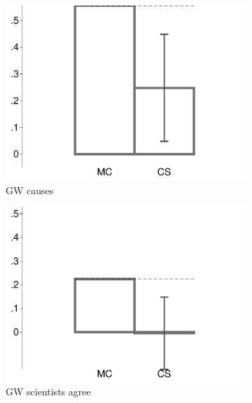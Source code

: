\begin{figure}[t]
\begin{subfigure}{.325\textwidth}
		\includegraphics[width=\textwidth]{../figs/confidence_score_ccd_ida_ips_increase_study1.pdf}
		\caption{GW causes}
	\end{subfigure}	
	\hfill
	\begin{subfigure}{.325\textwidth}\centering
		\includegraphics[width=\textwidth]{../figs/confidence_score_ccd_ida_ips_science_study1.pdf}
		\caption{GW scientists agree}
	\end{subfigure}	
	\begin{subfigure}{.325\textwidth}\centering

\end{subfigure}
\end{figure}
